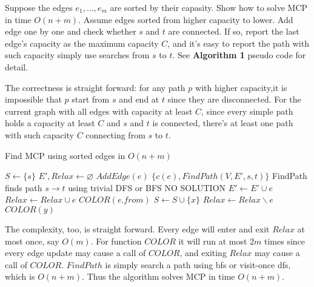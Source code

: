 \documentclass[11pt,a4paper,oneside]{article}
\begin{document}
\begin{problem}{1}
	\statement
	Suppose the edges $e_1,\dots,e_m$ are sorted by their capasity. Show how to solve MCP in time $O(n+m)$.
	\solution
	Assume edges sorted from higher capacity to lower. Add edge one by one and check whether \(s\) and \(t\) are connected. If so, report the last edge's capacity as the maximum capacity $C$, and it's easy to report the path with such capacity simply use searches from $s$ to $t$. See \textbf{Algorithm 1} pseudo code for detail.

	The correctness is straight forward: for any path $p$ with higher capacity,it is impossible that $p$ start from $s$ and end at $t$ since they are disconnected. For the current graph with all edges with capacity at least $C$, since every simple path holds a capacity at least $C$ and $s$ and $t$ is connected, there's at least one path with such capacity $C$ connecting from $s$ to $t$.

	\begin{algorithm}
		\caption{Find MCP using sorted edges in $O(n + m)$}
		\begin{algorithmic}[1]
			\State $S \leftarrow \{ s \}$
			\State $E',Relax \leftarrow \varnothing$
				\State $AddEdge(e)$
					\State \Return $\{c(e), FindPath(V, E', s, t)\}$
					\Comment FindPath finds path $s \rightarrow t$ using trivial DFS or BFS
				\EndIf
			\EndFor
			\State \Return NO SOLUTION
			\EndFunction
				\State $E' \leftarrow E' \cup e$
				\State $Relax \leftarrow Relax \cup e$
					\State $COLOR(e.from)$
				\EndIf
			\EndFunction
				\State $S \leftarrow S \cup \{ x \}$
				\State $Relax \leftarrow Relax \backslash e$
				\State $COLOR(y)$
				\EndFor
			\EndFunction
		\end{algorithmic}
	\end{algorithm}
	
	The complexity, too, is straight forward. Every edge will enter and exit $Relax$ at most once, say $O(m)$. For function $COLOR$ it will run at most $2m$ times since every edge update may cause a call of $COLOR$, and exiting $Relax$ may cause a call of $COLOR$. $FindPath$ is simply search a path using bfs or visit-once dfs, which is $O(n + m)$. Thus the algorithm solves MCP in time \(O(n + m)\).
\end{problem}
\end{document}
